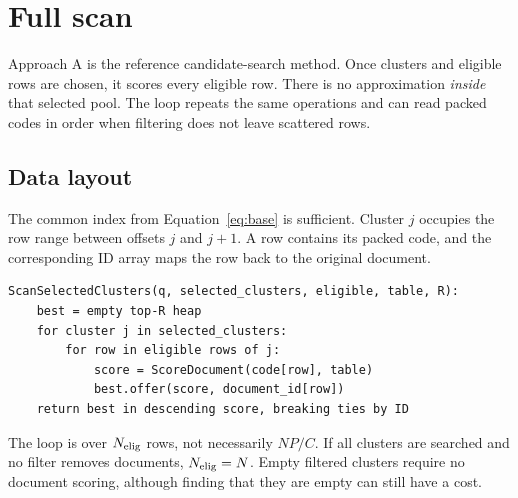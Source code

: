 \section{Full scan}
\label{sec:scan}
Approach A is the reference candidate-search method. Once clusters and eligible rows are chosen,
it scores every eligible row. There is no approximation \emph{inside} that selected pool.
The loop repeats the same operations and can read packed codes in order when filtering does
not leave scattered rows.


\subsection{Data layout}
The common index from Equation~\eqref{eq:base} is sufficient. Cluster $j$ occupies the row
range between offsets $j$ and $j+1$. A row contains its packed code, and the corresponding ID
array maps the row back to the original document.

\par\noindent\begin{minipage}{\linewidth}
\begin{lstlisting}[caption={Candidate search for Approach A.}]
ScanSelectedClusters(q, selected_clusters, eligible, table, R):
    best = empty top-R heap
    for cluster j in selected_clusters:
        for row in eligible rows of j:
            score = ScoreDocument(code[row], table)
            best.offer(score, document_id[row])
    return best in descending score, breaking ties by ID
\end{lstlisting}
\end{minipage}\par

The loop is over $N_{\mathrm{elig}}$ rows, not necessarily $NP/C$. If all clusters are searched and no
filter removes documents, $N_{\mathrm{elig}}=N$. Empty filtered clusters require no document scoring,
although finding that they are empty can still have a cost.

